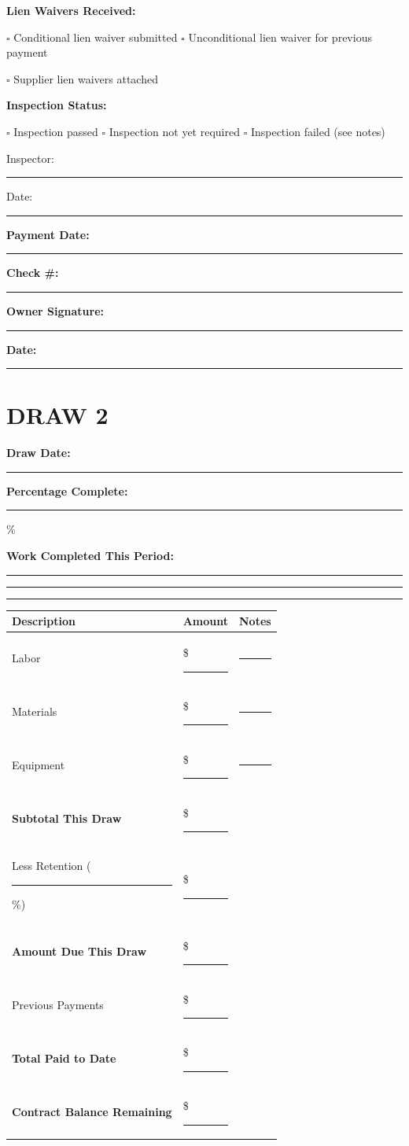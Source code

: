 \documentclass[11pt,letterpaper]{article}
\begin{document}
\vspace{6pt}

\textbf{Lien Waivers Received:}

$\square$ Conditional lien waiver submitted \hspace{0.3in} $\square$ Unconditional lien waiver for previous payment

$\square$ Supplier lien waivers attached

\textbf{Inspection Status:}

$\square$ Inspection passed \hspace{0.3in} $\square$ Inspection not yet required \hspace{0.3in} $\square$ Inspection failed (see notes)

Inspector: \rule{5cm}{0.4pt} Date: \rule{3cm}{0.4pt}

\textbf{Payment Date:} \rule{4cm}{0.4pt} \hspace{0.3in} \textbf{Check \#:} \rule{3cm}{0.4pt}

\textbf{Owner Signature:} \rule{5cm}{0.4pt} \textbf{Date:} \rule{2cm}{0.4pt}

\newpage

\section*{DRAW 2}

\textbf{Draw Date:} \rule{4cm}{0.4pt} \hspace{0.5in} \textbf{Percentage Complete:} \rule{2cm}{0.4pt} \%

\textbf{Work Completed This Period:}

\rule{14cm}{0.4pt}

\rule{14cm}{0.4pt}

\rule{14cm}{0.4pt}

\begin{tabular}{|p{3in}|p{1.5in}|p{1.5in}|}
\hline
\textbf{Description} & \textbf{Amount} & \textbf{Notes} \\
\hline
Labor & \$ \rule{1in}{0.4pt} & \rule{1in}{0.4pt} \\
\hline
Materials & \$ \rule{1in}{0.4pt} & \rule{1in}{0.4pt} \\
\hline
Equipment & \$ \rule{1in}{0.4pt} & \rule{1in}{0.4pt} \\
\hline
\textbf{Subtotal This Draw} & \$ \rule{1in}{0.4pt} & \\
\hline
Less Retention (\rule{1cm}{0.4pt}\%) & \$ \rule{1in}{0.4pt} & \\
\hline
\textbf{Amount Due This Draw} & \$ \rule{1in}{0.4pt} & \\
\hline
Previous Payments & \$ \rule{1in}{0.4pt} & \\
\hline
\textbf{Total Paid to Date} & \$ \rule{1in}{0.4pt} & \\
\hline
\textbf{Contract Balance Remaining} & \$ \rule{1in}{0.4pt} & \\
\hline
\end{tabular}
\end{document}
